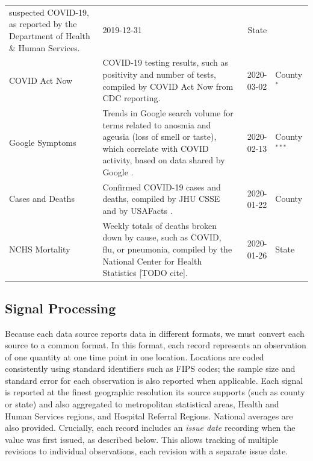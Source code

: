 \documentclass[9pt,twocolumn,twoside,lineno]{pnas-new}
\begin{document}
\begin{table}
\begin{tabular}{>{\raggedright}p{1.2in} p{4.0in} r >{\raggedright\arraybackslash}p{0.5in}}
suspected COVID-19, as reported by the Department of Health \& Human Services. &
2019-12-31 & State \\
    COVID Act Now & COVID-19 testing results, such as positivity and number of
tests, compiled by COVID Act Now from CDC reporting. & 2020-03-02 &
County$^*$ \\
  Google Symptoms & Trends in Google search volume for terms related to anosmia
and ageusia (loss of smell or taste), which correlate with COVID activity, based
on data shared by Google \cite{GoogleSymptoms}. & 2020-02-13 & County$^{***}$ \\
  Cases and Deaths & Confirmed COVID-19 cases and deaths, compiled by JHU CSSE
\cite{Dong:2020} and by USAFacts \cite{USAFacts}. & 2020-01-22 & County \\
  NCHS Mortality & Weekly totals of deaths broken down by cause, such as COVID,
flu, or pneumonia, compiled by the National Center for Health Statistics [TODO
cite]. & 2020-01-26 & State \\
    \bottomrule
\end{tabular}
\label{data-sources}
\end{table}

\subsection{Signal Processing}

Because each data source reports data in different formats, we must convert each
source to a common format. In this format, each record represents an observation
of one quantity at one time point in one location. Locations are coded
consistently using standard identifiers such as FIPS codes; the sample size and
standard error for each observation is also reported when applicable. Each
signal is reported at the finest geographic resolution its source supports (such
as county or state) and also aggregated to metropolitan statistical areas,
Health and Human Services regions, and Hospital Referral Regions. National
averages are also provided. Crucially, each record includes an \textit{issue
  date} recording when the value was first issued, as described below. This
allows tracking of multiple revisions to individual observations, each revision
with a separate issue date.
\end{document}
